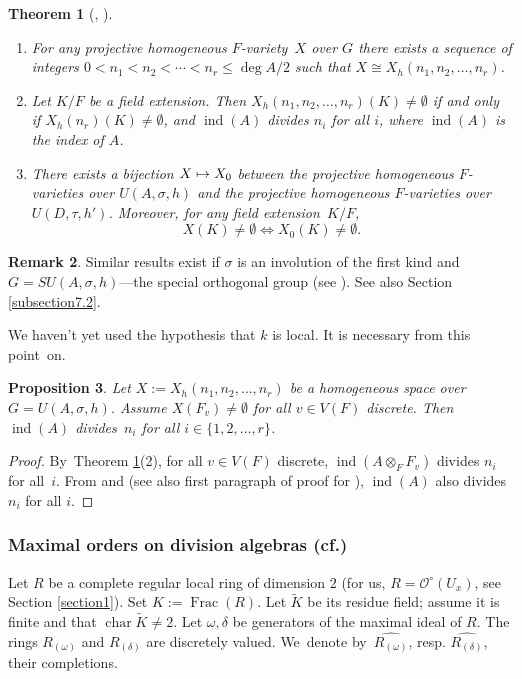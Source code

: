 \documentclass[10pt]{amsart}
\newcommand{\cf}{cf.}
\newcommand{\skpt}{\par\smallskip}
\newcommand{\mto}{\mathchoice{\longmapsto}{\mapsto}{\mapsto}{\mapsto}}
\DeclareMathOperator{\Char}{char}
\DeclareMathOperator{\Frac}{Frac}
\DeclareMathOperator{\ind}{ind}
\newtheorem{thm}{Theorem}[section]
\newtheorem{prop}[thm]{Proposition}
\theoremstyle{definition}
\newtheorem{rem}[thm]{Remark}
\begin{document}
\skpt
\begin{thm}[{\cite[\S 2]{wu}, \cite[Th.\,12.1]{parsur}}] \label{7.3}
\begin{enumerate}
\item
For any projective homogeneous $F$-variety~$X$ over $G$ there exists a sequence of integers $0< n_1 < n_2 < \cdots < n_r \leqslant \deg{A}/2$ such that $X \cong X_h(n_1, n_2, \dots, n_r)$.

\item
Let $K/F$ be a field extension. Then $X_h(n_1, n_2, \dots, n_r)(K) \neq \emptyset$ if and only if $X_h(n_r)(K) \neq \emptyset$, and $\ind(A)$ divides $n_i$ for all $i$, where $\ind(A)$ is the index of $A$.

\item
There exists a bijection $X \mto X_0$ between the projective homogeneous $F$\nobreakdash-va\-ri\-eties over $\textit{U}(A, \sigma, h)$ and the projective homogeneous $F$-varieties over $\textit{U}(D, \tau, h')$. Moreover, for any field extension~$K/F$,
\[
X(K) \neq \emptyset \iff X_0(K) \neq \emptyset.
\]
\end{enumerate}
\end{thm}

\begin{rem} \label{7.3.1} Similar results exist if $\sigma$ is an involution of the first kind and $G=\textit{SU}(A, \sigma, h)$---the special orthogonal group (see \cite[\S 2]{wu}). See also Section \ref{subsection7.2}.
\end{rem}

We haven't yet used the hypothesis that $k$ is local. It is necessary from this point~on.

\begin{prop}\label{7.4} Let $X:=X_h(n_1, n_2, \dots, n_r)$ be a homogeneous space over ${G=U(A, \sigma, h)}$.
Assume ${X(F_v) \neq \emptyset}$ for all $v \in V(F)$ discrete. Then $\ind(A)$ divi\-des~$n_i$ for all $i \in \{1, 2, \dots, r\}$.
\end{prop}

\begin{proof}
By~Theorem \ref{7.3}(2), for all $v \in V(F)$ discrete, $\ind(A \otimes_F F_v)$ divides $n_i$ for all~$i$. From \cite[Th.\,5.5]{hhk} and \cite[Prop.\,5.10]{parsurpreeti} (see also first paragraph of proof for \cite[Th.\,12.2]{parsur}), $\ind(A)$ also divides $n_i$ for all $i$.
\end{proof}

\subsubsection{Maximal orders on division algebras (\cf \cite[\S 10]{parsur})}
Let $R$ be a complete regular local ring of dimension $2$ (for us, $R=\mathcal{O}^{\circ}(U_x)$, see Section \ref{section1}). Set $K:=\Frac(R)$. Let $\widetilde{K}$ be its residue field; assume it is finite and that $\Char \widetilde{K} \neq 2$.
Let $\omega, \delta$ be generators of the maximal ideal of $R$. The rings $R_{(\omega)}$ and $R_{(\delta)}$ are discretely valued. We~denote by~$\widehat{R_{(\omega)}}$, resp. $\widehat{R_{(\delta)}}$, their completions.
\end{document}
